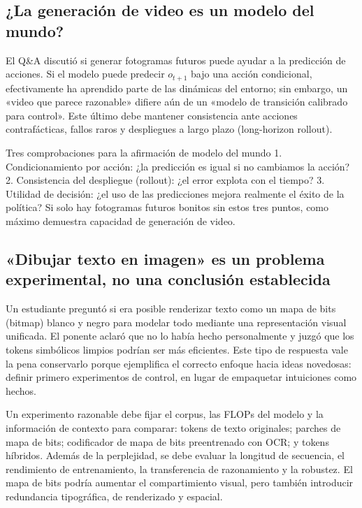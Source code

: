 \subsection{¿La generación de video es un modelo del mundo?}

El Q\&A discutió si generar fotogramas futuros puede ayudar a la predicción de acciones. Si el modelo puede predecir $o_{t+1}$ bajo una acción condicional, efectivamente ha aprendido parte de las dinámicas del entorno; sin embargo, un «video que parece razonable» difiere aún de un «modelo de transición calibrado para control». Este último debe mantener consistencia ante acciones contrafácticas, fallos raros y despliegues a largo plazo (long-horizon rollout).


\begin{warningbox}{Tres comprobaciones para la afirmación de modelo del mundo}
1. Condicionamiento por acción: ¿la predicción es igual si no cambiamos la acción? 2. Consistencia del despliegue (rollout): ¿el error explota con el tiempo? 3. Utilidad de decisión: ¿el uso de las predicciones mejora realmente el éxito de la política? Si solo hay fotogramas futuros bonitos sin estos tres puntos, como máximo demuestra capacidad de generación de video.
\end{warningbox}

\subsection{«Dibujar texto en imagen» es un problema experimental, no una conclusión establecida}

Un estudiante preguntó si era posible renderizar texto como un mapa de bits (bitmap) blanco y negro para modelar todo mediante una representación visual unificada. El ponente aclaró que no lo había hecho personalmente y juzgó que los tokens simbólicos limpios podrían ser más eficientes. Este tipo de respuesta vale la pena conservarlo porque ejemplifica el correcto enfoque hacia ideas novedosas: definir primero experimentos de control, en lugar de empaquetar intuiciones como hechos.

Un experimento razonable debe fijar el corpus, las FLOPs del modelo y la información de contexto para comparar: tokens de texto originales; parches de mapa de bits; codificador de mapa de bits preentrenado con OCR; y tokens híbridos. Además de la perplejidad, se debe evaluar la longitud de secuencia, el rendimiento de entrenamiento, la transferencia de razonamiento y la robustez. El mapa de bits podría aumentar el compartimiento visual, pero también introducir redundancia tipográfica, de renderizado y espacial.

